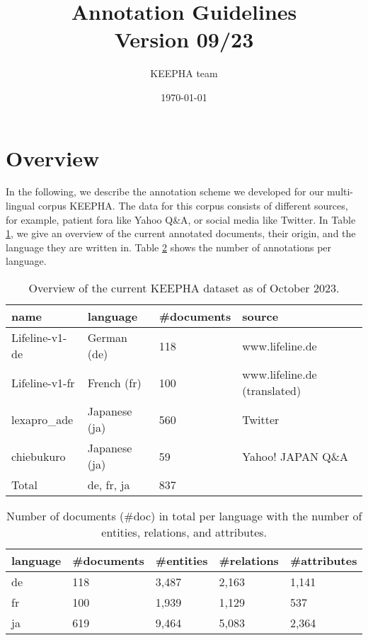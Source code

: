 \documentclass[12pt]{article}
\title{Annotation Guidelines\\ Version 09/23}
\author{KEEPHA team}
\date{\today}
\theoremstyle{definition}
\begin{document}
\maketitle

\tableofcontents

\clearpage

\section{Overview}
In the following, we describe the annotation scheme we developed for our multi-lingual corpus KEEPHA.
The data for this corpus consists of different sources, for example, patient fora like Yahoo Q\&A, or social media like Twitter.
In Table \ref{tab:data}, we give an overview of the current annotated documents, their origin, and the language they are written in.
Table \ref{tab:overview_detailed_annos} shows the number of annotations per language. 


\begin{table}[h]
\centering
\begin{tabular}{@{}llll@{}}
\toprule
\textbf{name}   & {\textbf{language}}   & \textbf{\#documents}   & \textbf{source}\\ \midrule
Lifeline-v1-de      & German (de)   & 118   &  www.lifeline.de  \\ 
Lifeline-v1-fr      & French (fr)   & 100   &  www.lifeline.de (translated) \\
lexapro\_ade        & Japanese (ja) & 560   & Twitter           \\
chiebukuro          & Japanese (ja) & 59    & Yahoo! JAPAN Q\&A \\ \midrule
Total               & de, fr, ja    & 837   &                   \\
\bottomrule
\end{tabular}
\caption{Overview of the current KEEPHA dataset as of October 2023.}
\label{tab:data}
\end{table}

\begin{table}[h]
\centering
\begin{tabular}{@{}lllll@{}}
\toprule
\textbf{language} & \textbf{\#documents} & \textbf{\#entities} & \textbf{\#relations} & \textbf{\#attributes}         \\ \midrule
de & 118                  & 3,487               & 2,163                & 1,141             \\
fr & 100                  & 1,939               & 1,129                & 537                \\ 
ja & 619                   & 9,464               & 5,083                & 2,364                   \\ 
\bottomrule
\end{tabular}
\caption{Number of documents (\#doc) in total per language with the number of entities, relations, and attributes.}
\label{tab:overview_detailed_annos}
\end{table}
\end{document}
